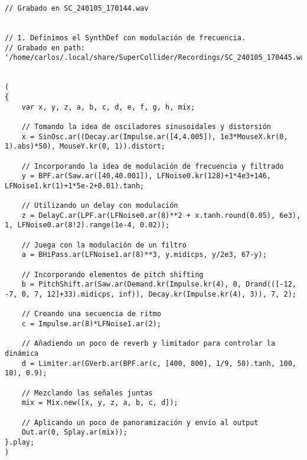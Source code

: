 \begin{minipage}[t]{1\textwidth}
    \centering
    \begin{lstlisting}[style=SuperCollider-IDE, basicstyle=\footnotesize\ttfamily, numbers=none]
// Grabado en SC_240105_170144.wav


// 1. Definimos el SynthDef con modulación de frecuencia.
// Grabado en path: '/home/carlos/.local/share/SuperCollider/Recordings/SC_240105_170445.wav'


(
{
    var x, y, z, a, b, c, d, e, f, g, h, mix;

    // Tomando la idea de osciladores sinusoidales y distorsión
    x = SinOsc.ar((Decay.ar(Impulse.ar([4,4.005]), 1e3*MouseX.kr(0, 1).abs)*50), MouseY.kr(0, 1)).distort;

    // Incorporando la idea de modulación de frecuencia y filtrado
    y = BPF.ar(Saw.ar([40,40.001]), LFNoise0.kr(128)+1*4e3+146, LFNoise1.kr(1)+1*5e-2+0.01).tanh;

    // Utilizando un delay con modulación
    z = DelayC.ar(LPF.ar(LFNoise0.ar(8)**2 + x.tanh.round(0.05), 6e3), 1, LFNoise0.ar(8!2).range(1e-4, 0.02));

    // Juega con la modulación de un filtro
    a = BHiPass.ar(LFNoise1.ar(8)**3, y.midicps, y/2e3, 67-y);

    // Incorporando elementos de pitch shifting
    b = PitchShift.ar(Saw.ar(Demand.kr(Impulse.kr(4), 0, Drand(([-12, -7, 0, 7, 12]+33).midicps, inf)), Decay.kr(Impulse.kr(4), 3)), 7, 2);

    // Creando una secuencia de ritmo
    c = Impulse.ar(8)*LFNoise1.ar(2);

    // Añadiendo un poco de reverb y limitador para controlar la dinámica
    d = Limiter.ar(GVerb.ar(BPF.ar(c, [400, 800], 1/9, 50).tanh, 100, 10), 0.9);

    // Mezclando las señales juntas
    mix = Mix.new([x, y, z, a, b, c, d]);

    // Aplicando un poco de panoramización y envío al output
    Out.ar(0, Splay.ar(mix));
}.play;
)        
    \end{lstlisting}
    \vspace{1cm}
\end{minipage}


















